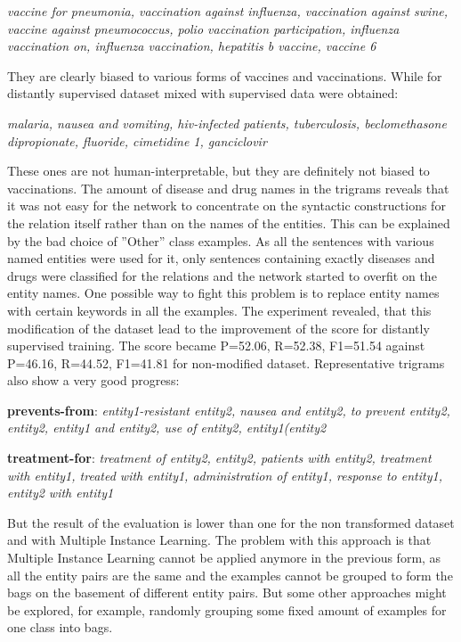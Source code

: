 \textit{vaccine for pneumonia, vaccination against influenza, vaccination against swine, vaccine 
against pneumococcus, polio vaccination participation, influenza vaccination on, influenza 
vaccination, hepatitis b vaccine, vaccine 6}

They are clearly biased to various forms of vaccines and vaccinations. While for distantly 
supervised dataset mixed with supervised data were obtained:

\textit{malaria, nausea and vomiting, hiv-infected patients, tuberculosis, beclomethasone dipropionate, fluoride, cimetidine 1, ganciclovir}

These ones are not human-interpretable, but they are definitely not biased to 
vaccinations. The amount of disease and drug names in the trigrams reveals 
that it was not easy for the network to concentrate on the syntactic constructions for the 
relation itself rather than on the names of the entities. This can be explained by 
the bad choice of ''Other'' class examples. As all the sentences with various 
named entities were used for it, only sentences containing exactly diseases and 
drugs were classified for the relations and the network started to overfit on the 
entity names. One possible way to fight this problem is to replace entity names with 
certain keywords in all the examples. The experiment revealed, that this modification 
of the dataset lead to the improvement of the score for distantly supervised training. 
The score became P=52.06, R=52.38, F1=51.54 against 
P=46.16, R=44.52, F1=41.81 for non-modified dataset. Representative trigrams also 
show a very good progress:

\textbf{prevents-from}: \textit{entity1-resistant entity2, nausea and entity2, to prevent entity2, entity2, entity1 and entity2, use of entity2, entity1(entity2}

\textbf{treatment-for}: \textit{treatment of entity2, entity2, patients with entity2, treatment with entity1, treated with entity1, administration of entity1, response to entity1, entity2 with entity1}

But the result of the evaluation is lower than one for the non transformed dataset and with Multiple Instance Learning.
The problem with this approach is that Multiple Instance Learning cannot be applied anymore in the previous form, 
as all the entity pairs are the same and the examples cannot be grouped to form the bags on the 
basement of different entity pairs. But some other approaches might be explored, for example, 
randomly grouping some fixed amount of examples for one class into bags.
